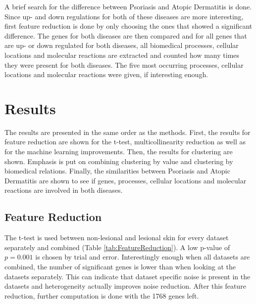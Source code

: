 \documentclass[10pt,a4paper]{report}
\begin{document}
	A brief search for the difference between Psoriasis and Atopic Dermatitis is done. Since up- and down regulations for both of these diseases are more interesting, first feature reduction is done by only choosing the ones that showed a significant difference. The genes for both diseases are then compared and for all genes that are up- or down regulated for both diseases, all biomedical processes, cellular locations and molecular reactions are extracted and counted how many times they were present for both diseases. The five most occurring processes, cellular locations and molecular reactions were given, if interesting enough.
	
	\section{Results}
	\label{sec:Results}
	
	The results are presented in the same order as the methods. First, the results for feature reduction are shown for the t-test, multicollinearity reduction as well as for the machine learning improvements. Then, the results for clustering are shown. Emphasis is put on combining clustering by value and clustering by biomedical relations. Finally, the similarities between Psoriasis and Atopic Dermatitis are shown to see if genes, processes, cellular locations and molecular reactions are involved in both diseases. 
	
	
	\subsection{Feature Reduction}
	\label{subsec:ResultsFeatureResuction}
	
	The t-test is used between non-lesional and lesional skin for every dataset separately and combined (Table \ref{tab:FeatureReduction}). A low p-value of $p=0.001$ is chosen by trial and error. Interestingly enough when all datasets are combined, the number of significant genes is lower than when looking at the datasets separately. This can indicate that dataset specific noise is present in the datasets and heterogeneity actually improves noise reduction. After this feature reduction, further computation is done with the 1768 genes left.
	
\end{document}
